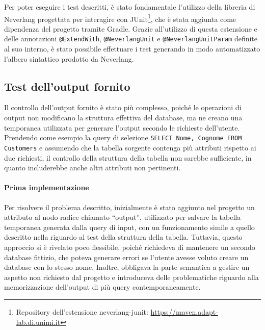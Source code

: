 \documentclass[12pt,a4paper,openright,twoside]{book}
\begin{document}


Per poter eseguire i test descritti, è stato fondamentale l’utilizzo della libreria di Neverlang progettata per interagire con 
JUnit\footnote{Repository dell’estensione neverlang-junit: \href{https://maven.adapt-lab.di.unimi.it/\#/neverlang/releases/it/unimi/di/adaptlab/neverlang-junit-extension}{https://maven.adapt-lab.di.unimi.it}}, 
che è stata aggiunta come dipendenza del progetto tramite Gradle. Grazie all’utilizzo di questa estensione e delle annotazioni 
\texttt{@ExtendWith}, \texttt{@NeverlangUnit} e \texttt{@NeverlangUnitParam} definite al suo interno, è stato possibile effettuare 
i test generando in modo automatizzato l’albero sintattico prodotto da Neverlang.

\subsection{Test dell’output fornito}
Il controllo dell’output fornito è stato più complesso, poiché le operazioni di output non modificano la struttura effettiva del 
database, ma ne creano una temporanea utilizzata per generare l’output secondo le richieste dell’utente. Prendendo come esempio la 
query di selezione \texttt{SELECT Nome, Cognome FROM Customers} e assumendo che la tabella sorgente contenga più attributi 
rispetto ai due richiesti, il controllo della struttura della tabella non sarebbe sufficiente, in quanto includerebbe anche altri 
attributi non pertinenti.

\paragraph{Prima implementazione}
Per risolvere il problema descritto, inizialmente è stato aggiunto nel progetto un attributo al nodo radice chiamato “output”, 
utilizzato per salvare la tabella temporanea generata dalla query di input, con un funzionamento simile a quello descritto nella 
 riguardo al test della struttura della tabella. Tuttavia, questo approccio si è rivelato poco flessibile, 
poiché richiedeva di mantenere un secondo database fittizio, che poteva generare errori se l’utente avesse voluto creare un database 
con lo stesso nome. Inoltre, obbligava la parte semantica a gestire un aspetto non richiesto dal progetto e introduceva delle 
problematiche riguardo alla memorizzazione dell’output di più query contemporaneamente.
\end{document}
